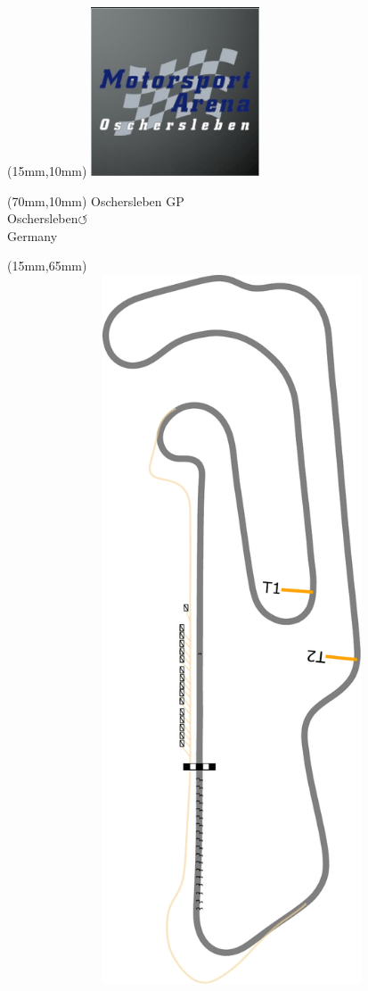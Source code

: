 \null\newpage
\begin{textblock*}{50mm}(15mm,10mm)%
\includegraphics[width=50mm]{LG/2015-05-20_00090.png}
\end{textblock*}
\begin{textblock*}{130mm}(70mm,10mm)%
{\fontsize{20}{20}\selectfont Oschersleben GP\\}
{\fontsize{16}{16}\selectfont Oschersleben\hfill \huge$\circlearrowleft$\\}
{\fontsize{12}{12}\selectfont Germany\\}
\end{textblock*}
\begin{textblock*}{185mm}(15mm,65mm)%
\centering
\mbox{\includegraphics[width=185mm,height=210mm,keepaspectratio]{PT/OSGP.pdf}}
\end{textblock*}
